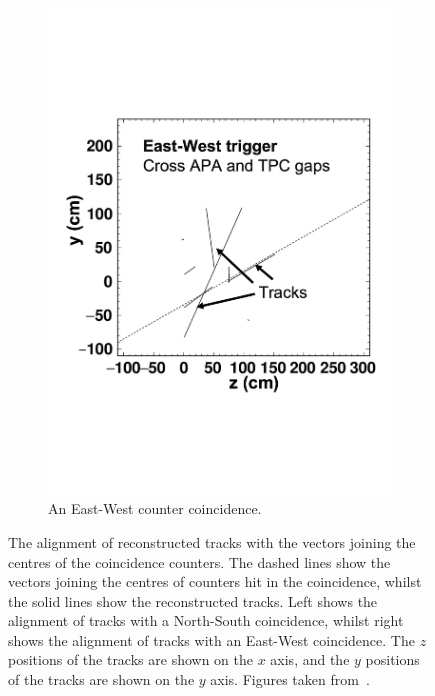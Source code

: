 \begin{figure}[h!]
\begin{subfigure}{0.48\textwidth}
    \includegraphics[width=\textwidth]{East-West}
    \caption{An East-West counter coincidence.}
  \end{subfigure}
  \caption[The alignment of reconstructed tracks with the vectors joining the centres of the coincidence counters]
          {The alignment of reconstructed tracks with the vectors joining the centres of the coincidence counters. The dashed lines show the vectors joining the centres of counters hit in the coincidence, whilst the solid lines show the reconstructed tracks. Left shows the alignment of tracks with a North-South coincidence, whilst right shows the alignment of tracks with an East-West coincidence. The $z$ positions of the tracks are shown on the $x$ axis, and the $y$ positions of the tracks are shown on the $y$ axis. Figures taken from~\citep{TingjunClustering}.}
          \label{fig:CounterTrackAngle}
\end{figure}

